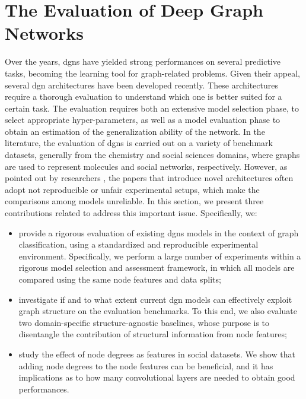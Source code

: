 \chapter{The Evaluation of Deep Graph Networks} \label{ch:evaluation-dgns}
Over the years, \glspl{dgn} have yielded strong performances on several predictive tasks, becoming the  learning tool for graph-related problems. Given their appeal, several \gls{dgn} architectures have been developed recently. These architectures require a thorough evaluation to understand which one is better suited for a certain task. The evaluation requires both an extensive model selection phase, to select appropriate hyper-parameters, as well as a model evaluation phase to obtain an estimation of the generalization ability of the network. In the literature, the evaluation of \glspl{dgn} is carried out on a variety of benchmark datasets, generally from the chemistry and social sciences domains, where graphs are used to represent molecules and social networks, respectively. However, as pointed out by researchers \citep{lipton2018troubling}, the papers that introduce novel architectures often adopt not reproducible or unfair experimental setups, which make the comparisons among models unreliable. In this section, we present three contributions related to address this important issue. Specifically, we:
\begin{itemize}
    \item provide a rigorous evaluation of existing \glspl{dgn} models in the context of graph classification, using a standardized and reproducible experimental environment. Specifically, we perform a large number of experiments within a rigorous model selection and assessment framework, in which all models are compared using the same node features and data splits;
    \item investigate if and to what extent current \gls{dgn} models can effectively exploit graph structure on the evaluation benchmarks. To this end, we also evaluate two domain-specific structure-agnostic baselines, whose purpose is to disentangle the contribution of structural information from node features;
    \item study the effect of node degrees as features in social datasets. We show that adding node degrees to the node features can be beneficial, and it has implications as to how many convolutional layers are needed to obtain good performances.
\end{itemize}

